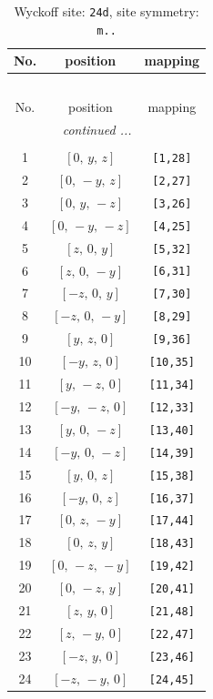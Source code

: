 \documentclass[fleqn,8pt]{jsarticle}
\begin{document}
\begin{longtable}{ccc}
\caption{Wyckoff site: {\tt 24d}, site symmetry: {\tt m..}}
 \\
 \hline \hline
No. & position & mapping \\ \hline \endfirsthead

\multicolumn{2}{l}{\tablename\ \thetable{}} \\
 \hline \hline
No. & position & mapping \\ \hline \endhead

 \hline \hline
\multicolumn{2}{r}{\footnotesize\it continued ...} \\ \endfoot

 \hline \hline
\multicolumn{2}{r}{} \\ \endlastfoot

1 & $\left[ 0,\, y,\, z \right]$ & {\tt [1,28]} \\ \hline
2 & $\left[ 0,\, - y,\, z \right]$ & {\tt [2,27]} \\ \hline
3 & $\left[ 0,\, y,\, - z \right]$ & {\tt [3,26]} \\ \hline
4 & $\left[ 0,\, - y,\, - z \right]$ & {\tt [4,25]} \\ \hline
5 & $\left[ z,\, 0,\, y \right]$ & {\tt [5,32]} \\ \hline
6 & $\left[ z,\, 0,\, - y \right]$ & {\tt [6,31]} \\ \hline
7 & $\left[ - z,\, 0,\, y \right]$ & {\tt [7,30]} \\ \hline
8 & $\left[ - z,\, 0,\, - y \right]$ & {\tt [8,29]} \\ \hline
9 & $\left[ y,\, z,\, 0 \right]$ & {\tt [9,36]} \\ \hline
10 & $\left[ - y,\, z,\, 0 \right]$ & {\tt [10,35]} \\ \hline
11 & $\left[ y,\, - z,\, 0 \right]$ & {\tt [11,34]} \\ \hline
12 & $\left[ - y,\, - z,\, 0 \right]$ & {\tt [12,33]} \\ \hline
13 & $\left[ y,\, 0,\, - z \right]$ & {\tt [13,40]} \\ \hline
14 & $\left[ - y,\, 0,\, - z \right]$ & {\tt [14,39]} \\ \hline
15 & $\left[ y,\, 0,\, z \right]$ & {\tt [15,38]} \\ \hline
16 & $\left[ - y,\, 0,\, z \right]$ & {\tt [16,37]} \\ \hline
17 & $\left[ 0,\, z,\, - y \right]$ & {\tt [17,44]} \\ \hline
18 & $\left[ 0,\, z,\, y \right]$ & {\tt [18,43]} \\ \hline
19 & $\left[ 0,\, - z,\, - y \right]$ & {\tt [19,42]} \\ \hline
20 & $\left[ 0,\, - z,\, y \right]$ & {\tt [20,41]} \\ \hline
21 & $\left[ z,\, y,\, 0 \right]$ & {\tt [21,48]} \\ \hline
22 & $\left[ z,\, - y,\, 0 \right]$ & {\tt [22,47]} \\ \hline
23 & $\left[ - z,\, y,\, 0 \right]$ & {\tt [23,46]} \\ \hline
24 & $\left[ - z,\, - y,\, 0 \right]$ & {\tt [24,45]} \\
\end{longtable}
\end{document}
